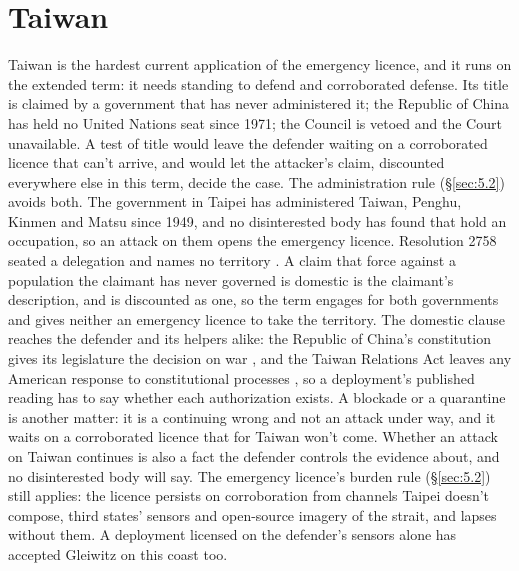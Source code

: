 \section{Taiwan}
\label{sec:G.3}
Taiwan is the hardest current application of the emergency licence, and it runs on the extended term: it needs standing to defend and corroborated defense. Its title is claimed by a government that has never administered it; the Republic of China has held no United Nations seat since 1971; the Council is vetoed and the Court unavailable. A test of title would leave the defender waiting on a corroborated licence that can't arrive, and would let the attacker's claim, discounted everywhere else in this term, decide the case. The administration rule (\S\ref{sec:5.2}) avoids both. The government in Taipei has administered Taiwan, Penghu, Kinmen and Matsu since 1949, and no disinterested body has found that hold an occupation, so an attack on them opens the emergency licence. Resolution 2758 seated a delegation and names no territory \autocite{unga1971res2758}. A claim that force against a population the claimant has never governed is domestic is the claimant's description, and is discounted as one, so the term engages for both governments and gives neither an emergency licence to take the territory. The domestic clause reaches the defender and its helpers alike: the Republic of China's constitution gives its legislature the decision on war \autocite{roc1947constitution}, and the Taiwan Relations Act leaves any American response to constitutional processes \autocite{tra1979}, so a deployment's published reading has to say whether each authorization exists. A blockade or a quarantine is another matter: it is a continuing wrong and not an attack under way, and it waits on a corroborated licence that for Taiwan won't come. Whether an attack on Taiwan continues is also a fact the defender controls the evidence about, and no disinterested body will say. The emergency licence's burden rule (\S\ref{sec:5.2}) still applies: the licence persists on corroboration from channels Taipei doesn't compose, third states' sensors and open-source imagery of the strait, and lapses without them. A deployment licensed on the defender's sensors alone has accepted Gleiwitz on this coast too.
